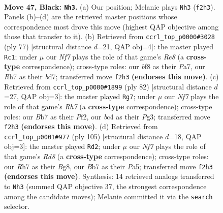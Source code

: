 \documentclass[11pt]{article}
\begin{document}
\clearpage

\begin{figure}[p]\centering
\begin{subfigure}{0.46\textwidth}\centering
\resizebox{\linewidth}{!}{%
\newchessgame
\chessboard[
  setfen={5BR1/pb1p3r/8/5k2/2B5/8/PPK2n2/8 b - - 15 47},
  showmover=false,
  pgfstyle=straightmove, color=movearrow, markmove={f2-h3}
]}
\caption{}
\end{subfigure}\hfill
\begin{subfigure}{0.46\textwidth}\centering
\resizebox{\linewidth}{!}{%
\newchessgame
\chessboard[
  setfen={6k1/p2B1p2/2PB4/3n4/P7/5P2/6K1/4r3 b - - 0 39},
  showmover=false,
  pgfstyle=straightmove, color=movearrow, markmove={e1-c1}
]}
\caption{}
\end{subfigure}
\\[4pt]
\begin{subfigure}{0.46\textwidth}\centering
\resizebox{\linewidth}{!}{%
\newchessgame
\chessboard[
  setfen={8/7R/2k3p1/r1b5/3p4/1K4P1/5P1P/5B2 w - - 1 42},
  showmover=false,
  pgfstyle=straightmove, color=movearrow, markmove={h7-g7}
]}
\caption{}
\end{subfigure}\hfill
\begin{subfigure}{0.46\textwidth}\centering
\resizebox{\linewidth}{!}{%
\newchessgame
\chessboard[
  setfen={4k1b1/2R5/8/p1P2P2/4KB2/7p/2P5/3r4 b - - 1 53},
  showmover=false,
  pgfstyle=straightmove, color=movearrow, markmove={d1-d2}
]}
\caption{}
\end{subfigure}
\caption{\textbf{Move 47, Black: \texttt{Nh3}.} (a) Our position; Melanie plays \texttt{Nh3} (\texttt{f2h3}). Panels (b)--(d) are the retrieved master positions whose correspondence most drove this move (highest QAP objective among those that transfer to it). (b) Retrieved from \texttt{ccrl\_top\_p0000\#3028} (ply 77) [structural distance $d$=21, QAP obj=4]: the master played \texttt{Rc1}; under $\mu$ our \emph{Nf7} plays the role of that game's \emph{Re8} (a \textbf{cross-type} correspondence); cross-type roles: our \emph{b}f8 as their \emph{P}a7, our \emph{R}h7 as their \emph{b}d7; transferred move \texttt{f2h3} \textbf{(endorses this move)}. (c) Retrieved from \texttt{ccrl\_top\_p0000\#1899} (ply 82) [structural distance $d$=27, QAP obj=3]: the master played \texttt{Rg7}; under $\mu$ our \emph{Nf7} plays the role of that game's \emph{Rh7} (a \textbf{cross-type} correspondence); cross-type roles: our \emph{B}b7 as their \emph{P}f2, our \emph{b}c4 as their \emph{P}g3; transferred move \texttt{f2h3} \textbf{(endorses this move)}. (d) Retrieved from \texttt{ccrl\_top\_p0001\#977} (ply 105) [structural distance $d$=18, QAP obj=3]: the master played \texttt{Rd2}; under $\mu$ our \emph{Nf7} plays the role of that game's \emph{Rd8} (a \textbf{cross-type} correspondence); cross-type roles: our \emph{R}h7 as their \emph{B}g8, our \emph{B}b7 as their \emph{P}a5; transferred move \texttt{f2h3} \textbf{(endorses this move)}. Synthesis: 14 retrieved analogs transferred to \texttt{Nh3} (summed QAP objective 37, the strongest correspondence among the candidate moves); Melanie committed it via the \texttt{search} selector.}
\label{fig:thought-m93}
\end{figure}
\end{document}
